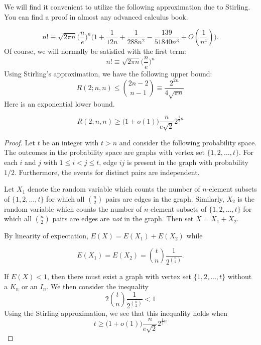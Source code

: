 We will find it convenient to utilize the following approximation
due to Stirling.  You can find a proof in almost any
advanced calculus book.

\[
n!\equiv \sqrt{2\pi n} \bigl( \frac{n}{e}\bigr)^n\bigl(1+
  \frac{1}{12n}+\frac{1}{288n^2}-\frac{139}{51840n^3} +O(\frac{1}{n^4})\bigr).
\]
Of course, we will normally be satisfied with the
first term:
\[
n!\equiv \sqrt{2\pi n} \bigl( \frac{n}{e}\bigr)^n
\]
Using Stirling's approximation, we have the following
upper bound:
\[
R(2;n,n) \le \binom{2n-2}{n-1} \equiv \frac{2^{2n}}{4\sqrt{\pi n}} 
\]
Here is an exponential lower bound.

\begin{theorem}
\[
R(2;n,n) \ge \bigl(1+o(1)\bigr) \frac{n}{e\sqrt2} 2^{\frac{1}{2}n}
\]
\end{theorem}

\begin{proof}
Let $t$ be an integer with $t>n$ and consider the following
probability space.  The outcomes in the probability space
are graphs with vertex set $\{1,2,\dots,t\}$.  For each
$i$ and $j$ with $1\le i < j\le t$, edge $ij$ is present
in the graph with probability $1/2$.  Furthermore, the
events for distinct pairs are independent.

Let $X_1$ denote the random variable which counts the number
of $n$-element subsets of $\{1,2,\dots,t\}$ for which all
$\binom{n}{2}$ pairs are edges in the graph.  Similarly,
$X_2$ is the random variable which counts the number
of $n$-element subsets of $\{1,2,\dots,t\}$ for which all
$\binom{n}{2}$ pairs are edges are \textit{not} in the graph.  
Then set $X=X_1+X_2$.

By linearity of expectation, $E(X)=E(X_1)+E(X_2)$ while

\[
E(X_1)=E(X_2) = \binom{t}{n} \frac{1}{2^{\binom{n}{2}}}.
\]

If $E(X)<1$, then there must exist a graph with vertex
set $\{1,2,\dots,t\}$ without a $K_n$ or an $I_n$.
We then consider the inequality
\[
2\binom{t}{n}\frac{1}{2^{\binom{n}{2}}} < 1
\]
Using the Stirling approximation, we see that this
inequality holds when
\[
t \ge \bigl(1+o(1)\bigr) \frac{n}{e\sqrt2} 2^{\frac{1}{2}n}
\]
\end{proof}

